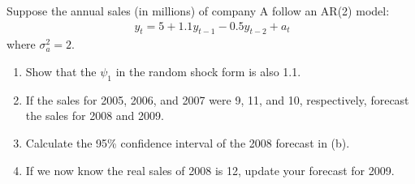 \documentclass[UTF8,a4paper,14pt]{ctexart}
\theoremstyle{definition}
\theoremstyle{remark}
\begin{document}
\begin{Problem}{}
  Suppose the annual sales (in millions) of company A follow an AR(2) model:
  \begin{equation}\
    \begin{aligned}
      y_t= 5+1.1y_{t-1}-0.5 y_{t-2} +a_t
    \end{aligned}
  \end{equation}
where \(\sigma_a^2=2\).
\begin{enumerate}[label=(\alph*)]
  \item Show that the \(\psi_1\) in the random shock form is also 1.1. 
  \item If the sales for 2005, 2006, and 2007 were 9, 11, and 10, respectively, forecast the sales for 2008 and 2009.
  \item Calculate the 95\% confidence interval of the 2008 forecast in (b).
  \item If we now know the real sales of 2008 is 12, update your forecast for 2009.
\end{enumerate}

\end{Problem}
\end{document}
